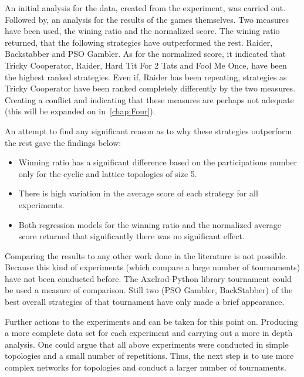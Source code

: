 An initial analysis for the data, created from the experiment, was carried out.
Followed by, an analysis for the results of the games themselves.
Two measures have been used, the wining ratio and the normalized score. The
wining ratio returned, that the following strategies have outperformed the rest.
Raider, Backstabber and PSO Gambler. As for the normalized score, it indicated
that Tricky Cooperator,  Raider, Hard Tit For 2 Tats and Fool Me Once, have been the
highest ranked strategies. Even if, Raider has been repeating, strategies as
Tricky Cooperator have been ranked completely differently by the two measures.
Creating a conflict and indicating that these measures are perhaps not adequate
(this will be expanded on in~\autoref{chap:Four}).

An attempt to find any significant reason as to why these strategies outperform
the rest gave the findings below:

\begin{itemize}
	\item Winning ratio has a significant difference based on the participations
	      number only for the cyclic and lattice topologies of size 5.
	\item There is high variation in the average score of each strategy for all
	      experiments.
	\item Both regression models for the winning ratio and the normalized average
	      score returned that significantly there was no significant effect.
\end{itemize}

Comparing the results to any other work done in the literature is not possible.
Because this kind of experiments (which compare a large number of tournaments)
have not been conducted before.
The Axelrod-Python library tournament could be used  a measure of comparison.
Still two (PSO Gambler, BackStabber) of the best overall strategies of that
tournament have only made a brief appearance.

Further actions to the experiments and can be taken for this point on.
Producing a more complete data set for each experiment and carrying out a more
in depth analysis. One could argue that all above experiments
were conducted in simple topologies and a small number of repetitions. Thus, the
next step is to use more complex networks for topologies and conduct a larger
number of tournaments.
